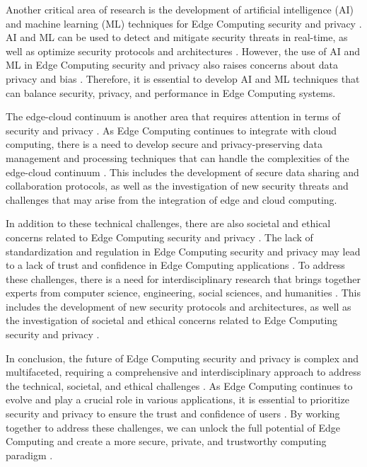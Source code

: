 \documentclass[11pt,a4paper]{article}
\begin{document}
Another critical area of research is the development of artificial intelligence (AI) and machine learning (ML) techniques for Edge Computing security and privacy \cite{arxiv:1907.08349}. AI and ML can be used to detect and mitigate security threats in real-time, as well as optimize security protocols and architectures \cite{arxiv:1905.10083}. However, the use of AI and ML in Edge Computing security and privacy also raises concerns about data privacy and bias \cite{arxiv:1908.00080}. Therefore, it is essential to develop AI and ML techniques that can balance security, privacy, and performance in Edge Computing systems.

The edge-cloud continuum is another area that requires attention in terms of security and privacy \cite{arxiv:2309.05416}. As Edge Computing continues to integrate with cloud computing, there is a need to develop secure and privacy-preserving data management and processing techniques that can handle the complexities of the edge-cloud continuum \cite{arxiv:2211.01863}. This includes the development of secure data sharing and collaboration protocols, as well as the investigation of new security threats and challenges that may arise from the integration of edge and cloud computing.

In addition to these technical challenges, there are also societal and ethical concerns related to Edge Computing security and privacy \cite{arxiv:2112.01250}. The lack of standardization and regulation in Edge Computing security and privacy may lead to a lack of trust and confidence in Edge Computing applications \cite{arxiv:2205.01423}. To address these challenges, there is a need for interdisciplinary research that brings together experts from computer science, engineering, social sciences, and humanities \cite{arxiv:2109.12195}. This includes the development of new security protocols and architectures, as well as the investigation of societal and ethical concerns related to Edge Computing security and privacy \cite{arxiv:2212.04645}.

In conclusion, the future of Edge Computing security and privacy is complex and multifaceted, requiring a comprehensive and interdisciplinary approach to address the technical, societal, and ethical challenges \cite{arxiv:2303.14329}. As Edge Computing continues to evolve and play a crucial role in various applications, it is essential to prioritize security and privacy to ensure the trust and confidence of users \cite{arxiv:2301.07803}. By working together to address these challenges, we can unlock the full potential of Edge Computing and create a more secure, private, and trustworthy computing paradigm \cite{arxiv:2412.01412}.
\end{document}
